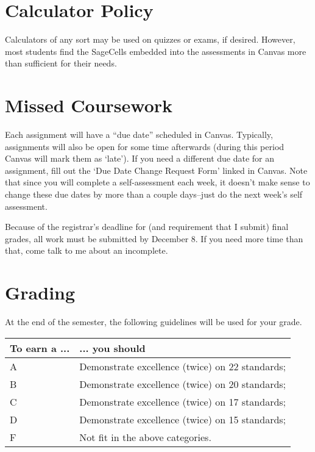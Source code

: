 \documentclass{article}
\begin{document}
\section*{\fontsize{12}{15}\selectfont Calculator Policy}

Calculators of any sort may be used on quizzes or exams, if desired. However, most students find the SageCells embedded into the assessments in Canvas more than sufficient for their needs.

\section*{\fontsize{12}{15}\selectfont Missed Coursework}

Each assignment will have a ``due date'' scheduled in Canvas.  Typically, assignments will also be open for some time afterwards (during this period Canvas will mark them as `late').  If you need a different due date for an assignment, fill out the `Due Date Change Request Form' linked in Canvas.  Note that since you will complete a self-assessment each week, it doesn't make sense to change these due dates by more than a couple days--just do the next week's self assessment.

Because of the registrar's deadline for (and requirement that I submit) final grades, all work must be submitted by December 8.  If you need more time than that, come talk to me about an incomplete.

\noindent \begin{minipage}{\textwidth}
\section*{\fontsize{12}{15}\selectfont Grading}
At the end of the semester, the following guidelines will be used for your grade.  \\

\begin{center}
 \begin{tabular}{l|l} 
To earn a  ... & ... you should \\
\hline
A & Demonstrate excellence (twice) on 22 standards;  \\
\hline

B & Demonstrate excellence (twice) on 20 standards; \\
\hline

C 	& Demonstrate excellence (twice) on 17 standards;\\
\hline

D & Demonstrate excellence (twice) on 15 standards;\\
\hline

F 	& Not fit in the above categories. \\
\hline
\end{tabular}
\end{center}
\end{minipage}
\end{document}
